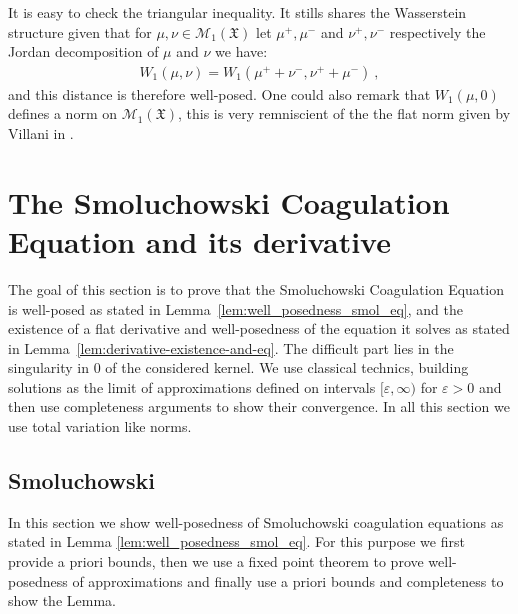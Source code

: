 \documentclass[11pt,a4paper]{article}
\newcommand{\MC}{\mathcal{M}}
\newcommand{\XF}{\mathfrak{X}}
\begin{document}
It is easy to check the triangular inequality. It stills shares the Wasserstein structure given that for $\mu,\nu \in \MC_{1}(\XF)$ let $\mu^+,\mu^-$ and $\nu^+,\nu^-$ respectively the Jordan decomposition of $\mu$ and $\nu$ we have:
\begin{align*}
    W_{1}(\mu, \nu) = W_{1}(\mu^+ + \nu^-, \nu^+ + \mu^-)\ ,
\end{align*}
and this distance is therefore well-posed. One could also remark that $W_{1}(\mu,0)$ defines a norm on $\MC_{1}(\XF)$, this is very remniscient of the the flat norm given by Villani in \cite{villani2008optimal}.


\section{The Smoluchowski Coagulation Equation and its derivative}\label{section:well-posedness-SCE}

The goal of this section is to prove that the Smoluchowski Coagulation Equation is well-posed as stated in Lemma~\ref{lem:well_posedness_smol_eq}, and the existence of a flat derivative and well-posedness of the equation it solves as stated in Lemma~\ref{lem:derivative-existence-and-eq}. The difficult part lies in the singularity in $0$ of the considered kernel. We use classical technics, building solutions as the limit of approximations defined on intervals $[\varepsilon,\infty)$ for $\varepsilon > 0$ and then use completeness arguments to show their convergence. In all this section we use total variation like norms.

\subsection{Smoluchowski}
In this section we show well-posedness of Smoluchowski coagulation equations as stated in Lemma \ref{lem:well_posedness_smol_eq}. For this purpose we first provide a priori bounds, then we use a fixed point theorem to prove well-posedness of approximations and finally use a priori bounds and completeness to show the Lemma.
\end{document}
